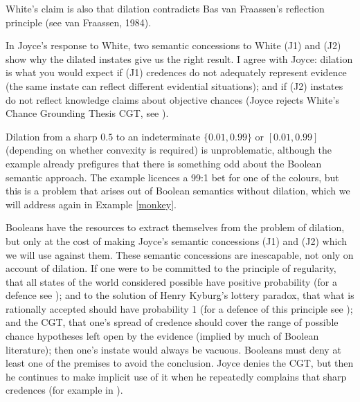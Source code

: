 \documentclass[11pt]{article}
\begin{document}
White's claim is also that dilation contradicts Bas van Fraassen's reflection principle (see van Fraassen, 1984).

In Joyce's response to White, two semantic concessions to White (J1) and (J2) show why the dilated instates give us the right result. I agree with Joyce: dilation is what you would expect if (J1) credences do not adequately represent evidence (the same instate can reflect different evidential situations); and if (J2) instates do not reflect knowledge claims about objective chances (Joyce rejects White's Chance Grounding Thesis CGT, see ). 

\addtocounter{expls}{1}


Dilation from a sharp $0.5$ to an indeterminate $\{0.01,0.99\}$ or $[0.01,0.99]$ (depending on whether convexity is required) is unproblematic, although the example already prefigures that there is something odd about the Boolean semantic approach. The example licences a 99:1 bet for one of the colours, but this is a problem that arises out of Boolean semantics without dilation, which we will address again in Example \ref{monkey}.

Booleans have the resources to extract themselves from the problem of dilation, but only at the cost of making Joyce's semantic concessions (J1) and (J2) which we will use against them. These semantic concessions are inescapable, not only on account of dilation. If one were to be committed to the principle of regularity, that all states of the world considered possible have positive probability (for a defence see ); and to the solution of Henry Kyburg's lottery paradox, that what is rationally accepted should have probability 1 (for a defence of this principle see ); and the CGT, that one's spread of credence should cover the range of possible chance hypotheses left open by the evidence (implied by much of Boolean literature); then one's instate would always be vacuous. Booleans must deny at least one of the premises to avoid the conclusion. Joyce denies the CGT, but then he continues to make implicit use of it when he repeatedly complains that sharp credences  (for example in ).
\end{document}
